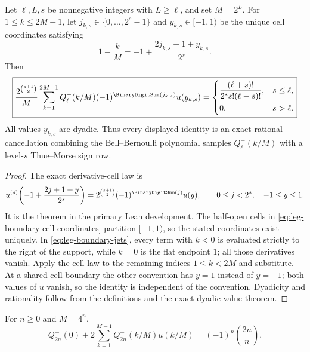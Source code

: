 {\begin{corollary}
\label{cor:leg-thue-morse-boundary-jets}
Let $\ell,L,s$ be nonnegative integers with $L\ge\ell$, and set $M=2^L$.
For
$1\le k\le2M-1$, let $j_{k,s}\in\{0,\ldots,2^s-1\}$ and
$y_{k,s}\in[-1,1)$ be the unique cell coordinates satisfying
\begin{equation}
 1-\frac{k}{M}
 =-1+\frac{2j_{k,s}+1+y_{k,s}}{2^s}.
 \label{eq:leg-boundary-cell-coordinates}
\end{equation}
Then
\begin{equation}
 \boxed{
 \frac{2^{\binom{s+1}{2}}}{M}
 \sum_{k=1}^{2M-1}Q_\ell^-(k/M)
 (-1)^{\BinaryDigitSum(j_{k,s})}u(y_{k,s})
 =
 \begin{cases}
 \dfrac{(\ell+s)!}{2^ss!(\ell-s)!},&s\le\ell,\\[0.7em]
 0,&s>\ell.
 \end{cases}}
 \label{eq:leg-thue-morse-boundary-jets}
\end{equation}
All values $y_{k,s}$ are dyadic.  Thus every displayed identity is an exact
rational cancellation combining the Bell--Bernoulli polynomial samples
$Q_\ell^-(k/M)$ with a level-$s$ Thue--Morse sign row.
\end{corollary}

\begin{proof}
The exact derivative-cell law is
\[
 u^{(s)}\!\left(-1+\frac{2j+1+y}{2^s}\right)
 =2^{\binom{s+1}{2}}(-1)^{\BinaryDigitSum(j)}u(y),
 \qquad 0\le j<2^s,\quad -1\le y\le1.
\]
It is the theorem  in the primary Lean
development.  The half-open cells in
\eqref{eq:leg-boundary-cell-coordinates} partition $[-1,1)$, so the stated
coordinates exist uniquely.  In \eqref{eq:leg-boundary-jets}, every term with
$k<0$ is evaluated strictly to the right of the support, while $k=0$ is the
flat endpoint $1$; all those derivatives vanish.  Apply the cell law to the
remaining indices $1\le k<2M$ and substitute.  At a shared cell boundary the
other convention has $y=1$ instead of $y=-1$; both values of $u$ vanish, so
the identity is independent of the convention.  Dyadicity and rationality
follow from the definitions and the exact dyadic-value theorem.
\end{proof}

\begin{corollary}
\label{cor:leg-central-sum}
For $n\ge0$ and $M=4^n$,
\begin{equation}
 \boxed{
 Q_{2n}^-(0)+2\sum_{k=1}^{M-1}
 Q_{2n}^-(k/M)u(k/M)=(-1)^n\binom{2n}{n}.}
 \label{eq:leg-central-sum}
\end{equation}
\end{corollary}

}
